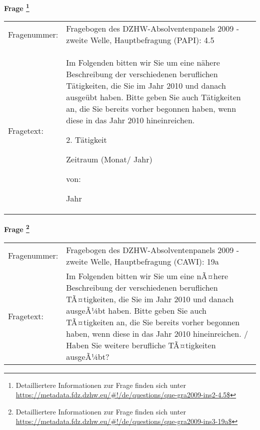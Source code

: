 				\vspace*{0.5cm}
                \noindent\textbf{Frage
	                \footnote{Detailliertere Informationen zur Frage finden sich unter
		              \url{https://metadata.fdz.dzhw.eu/\#!/de/questions/que-gra2009-ins2-4.5$}}}\\
				\begin{tabularx}{\hsize}{@{}lX}
					Fragenummer: &
					  Fragebogen des DZHW-Absolventenpanels 2009 - zweite Welle, Hauptbefragung (PAPI):
					  4.5
 \\
					Fragetext: & Im Folgenden bitten wir Sie um eine nähere Beschreibung der verschiedenen beruflichen Tätigkeiten, die Sie im Jahr 2010 und danach ausgeübt haben. Bitte geben Sie auch Tätigkeiten an, die Sie bereits vorher begonnen haben, wenn diese in das Jahr 2010 hineinreichen.\par  2. Tätigkeit\par  Zeitraum (Monat/ Jahr)\par  von:\par  Jahr \\
				\end{tabularx}
				\vspace*{0.5cm}
                \noindent\textbf{Frage
	                \footnote{Detailliertere Informationen zur Frage finden sich unter
		              \url{https://metadata.fdz.dzhw.eu/\#!/de/questions/que-gra2009-ins3-19a$}}}\\
				\begin{tabularx}{\hsize}{@{}lX}
					Fragenummer: &
					  Fragebogen des DZHW-Absolventenpanels 2009 - zweite Welle, Hauptbefragung (CAWI):
					  19a
 \\
					Fragetext: & Im Folgenden bitten wir Sie um eine nÃ¤here Beschreibung der verschiedenen beruflichen TÃ¤tigkeiten, die Sie im Jahr 2010 und danach ausgeÃ¼bt haben. Bitte geben Sie auch TÃ¤tigkeiten an, die Sie bereits vorher begonnen haben, wenn diese in das Jahr 2010 hineinreichen. / Haben Sie weitere berufliche TÃ¤tigkeiten ausgeÃ¼bt? \\
				\end{tabularx}






